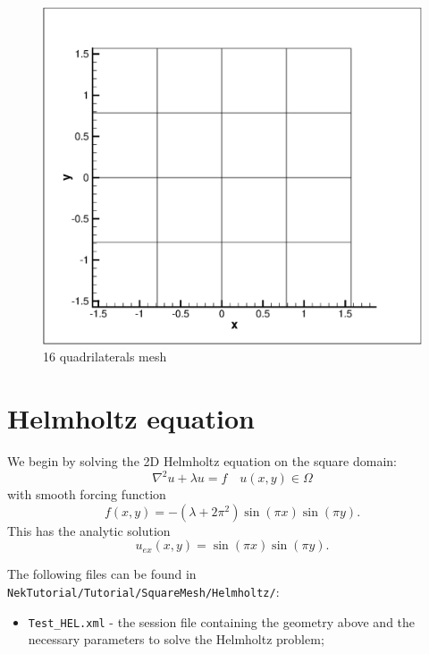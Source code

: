 \documentclass[a4paper,12pt]{article}
\begin{document}
\begin{figure}
\centering
\includegraphics[scale=0.35]{mesh.eps}
\caption{16 quadrilaterals mesh}
\label{fig:Mesh}
\end{figure}


\clearpage
\section{Helmholtz equation}

We begin by solving the 2D Helmholtz equation on the square domain:
\begin{equation}
\nabla^2 u + \lambda u = f \quad u(x,y) \in \Omega
\end{equation}
with smooth forcing function
\begin{equation}
f(x,y)= -(\lambda + 2\pi^2)\sin(\pi x)\sin(\pi y).
\end{equation}
This has the analytic solution
\begin{equation}
u_{ex}(x,y)= \sin(\pi x)\sin(\pi y).
\end{equation}
 
The following files can be found in
\texttt{NekTutorial/Tutorial/SquareMesh/Helmholtz/}:
 \begin{itemize}
 \item \texttt{Test\_HEL.xml} - the \nektar session file containing
 the geometry above and the necessary parameters to solve the Helmholtz problem;
 \end{itemize} 
\end{document}
